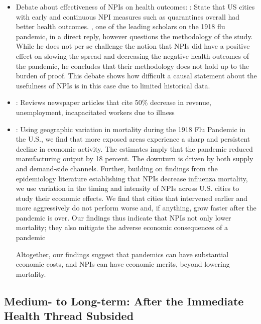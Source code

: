 \documentclass[12pt,a4paper]{article}
\begin{document}
\begin{itemize}
	\item Debate about effectiveness of NPIs on health outcomes:
	\cite{markelNonpharmaceuticalInterventionsImplemented2007}: State that US cities with early and continuous NPI measures such as quarantines overall had better health outcomes.
	\cite{barryCommentsNonpharmaceuticalInterventions2007}, one of the leading scholars on the 1918 flu pandemic, in a direct reply, however questions the methodology of the study.
	While he does not per se challenge the notion that NPIs did have a positive effect on slowing the spread and decreasing the negative health outcomes of the pandemic, he concludes that their methodology does not hold up to the burden of proof.
	This debate shows how difficult a causal statement about the usefulness of NPIs is in this case due to limited historical data.
	
	\item \cite{garrettEconomicEffects19182007}: Reviews newspaper articles that cite 50\% decrease in revenue, unemployment, incapacitated workers due to illness
	
	\item \cite{correiaPandemicsDepressEconomy2020}:
	Using geographic variation in mortality during the 1918 Flu Pandemic in
	the U.S., we find that more exposed areas experience a sharp and persistent decline
	in economic activity. The estimates imply that the pandemic reduced manufacturing
	output by 18 percent. The downturn is driven by both supply and demand-side channels.
	Further, building on findings from the epidemiology literature establishing that NPIs
	decrease influenza mortality, we use variation in the timing and intensity of NPIs
	across U.S. cities to study their economic effects. We find that cities that intervened
	earlier and more aggressively do not perform worse and, if anything, grow faster after
	the pandemic is over. Our findings thus indicate that NPIs not only lower mortality;
	they also mitigate the adverse economic consequences of a pandemic
	
	Altogether, our	findings suggest that pandemics can have substantial economic costs, and NPIs can have
	economic merits, beyond lowering mortality.
\end{itemize}

\subsection{Medium- to Long-term: After the Immediate Health Thread Subsided}
\end{document}
